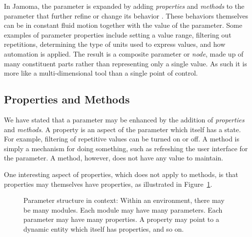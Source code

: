 \documentclass{article}
\begin{document}
In Jamoma, the parameter is expanded by adding \emph{properties} and \emph{methods} to the parameter that further refine or change its behavior \cite{Place:2008}. These behaviors themselves can be in constant fluid motion together with the value of the parameter. Some examples of parameter properties include setting a value range, filtering out repetitions, determining the type of units used to express values, and how automation is applied.  The result is a composite parameter or \emph{node}, made up of many constituent parts rather than representing only a single value. As such it is more like a multi-dimensional tool than a single point of control.

\subsection{Properties and Methods} %
\label{sec:properties_and_methods}

We have stated that a parameter may be enhanced by the addition of \emph{properties} and \emph{methods}. A property is an aspect of the parameter which itself has a state. For example, filtering of repetitive values can be turned on or off. A method is simply a mechanism for doing something, such as refreshing the user interface for the parameter. A method, however, does not have any value to maintain.

One interesting aspect of properties, which does not apply to methods, is that properties may themselves have properties, as illustrated in Figure~\ref{fig:structure}.

\begin{figure}
\centerline{}
\caption{Parameter structure in context: Within an environment, there may be many modules. Each module may have many parameters. Each parameter may have many properties. A property may point to a dynamic entity which itself has properties, and so on.}
\label{fig:structure}
\end{figure}
\end{document}
